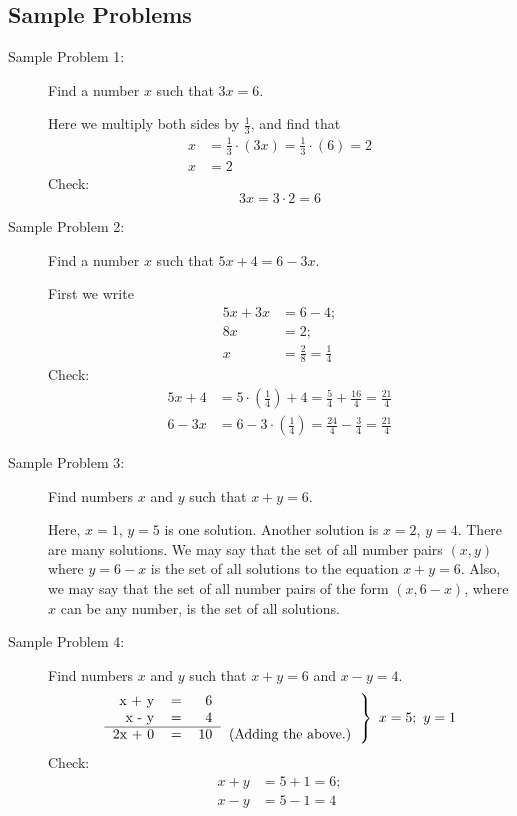 \documentclass{article}
\begin{document}
\subsection{Sample Problems}

\begin{description}

  \item[Sample Problem 1:] Find a number $x$ such that $3x = 6$. 

    Here we multiply both sides by $\frac{1}{3}$, and find that
    \begin{align*}
    x & = \frac{1}{3} \cdot (3x) = \frac{1}{3} \cdot (6) = 2 \\
    x & = 2
    \end{align*}
    Check:
    \begin{equation*}
    3x = 3 \cdot 2 = 6
    \end{equation*}

  \item[Sample Problem 2:] Find a number $x$ such that $5x + 4 = 6 - 3x$.

    First we write
    \begin{align*}
    5x + 3x & = 6 - 4; \\
    8x & = 2; \\
    x & = \frac{2}{8} = \frac{1}{4}
    \end{align*}
    Check:
    \begin{align*}
    5x + 4 & = 5 \cdot \left( \frac{1}{4} \right) + 4 = \frac{5}{4} + \frac{16}{4} = \frac{21}{4} \\
    6 - 3x & = 6 - 3 \cdot \left( \frac{1}{4} \right) = \frac{24}{4} - \frac{3}{4} = \frac{21}{4}
    \end{align*}

  \item[Sample Problem 3:] Find numbers $x$ and $y$ such that $x + y = 6$.

    Here, $x=1$, $y=5$ is one solution. Another solution is $x=2$, $y=4$. There are many solutions. We may say that the set of all number pairs $(x,y)$ where $y = 6-x$ is the set of all solutions to the equation $x+y = 6$. Also, we may say that the set of all number pairs of the form $(x,6-x)$, where $x$ can be any number, is the set of all solutions.

  \item[Sample Problem 4:] Find numbers $x$ and $y$ such that $x+y = 6$ and $x-y = 4$.
    \begin{equation*}
    \left.
    \begin{tabular}{rrrc}
       x + y & = &  6 & \\
       x - y & = &  4 & \\ 
      \cline{1-3}
      2x + 0 & = & 10 & (Adding the above.)
    \end{tabular}
    \right\}
    \ x = 5;\ y = 1
    \end{equation*}
    Check: 
    \begin{align*}
    x + y & = 5 + 1 = 6; \\
    x - y & = 5 - 1 = 4
    \end{align*}


\end{description}
\end{document}
